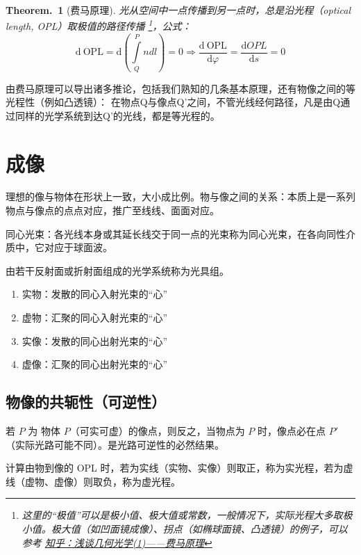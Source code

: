 \documentclass[UTF8]{report}
\theoremstyle{MyLineTheoremStyle} %
\theoremstyle{MyBlockTheoremStyle} %
\newtheorem{BlockTheorem}[LineTheorem]{Theorem.\,} %
\theoremstyle{MySubsubsectionStyle} %
\begin{document}
\begin{BlockTheorem}[费马原理]\label{费马原理}
光从空间中一点传播到另一点时，总是沿光程（optical length, OPL）取极值的路径传播 \footnote{这里的“极值”可以是极小值、极大值或常数，一般情况下，实际光程大多取极小值。极大值（如凹面镜成像）、拐点（如椭球面镜、凸透镜）的例子，可以参考 \href{https://zhuanlan.zhihu.com/p/107739173}{知乎：浅谈几何光学(1)——费马原理}}，公式：
\begin{equation}
    \mathrm{d}\ \mathrm{OPL} =  \mathrm{d}\left(\int\limits_{Q}^{P}ndl\right)=0 \Longrightarrow \frac{\mathrm{d}\  \mathrm{OPL} }{\mathrm{d} \varphi } = \frac{\mathrm{d} OPL }{\mathrm{d} s } = 0 
\end{equation}
\end{BlockTheorem}
由费马原理可以导出诸多推论，包括我们熟知的几条基本原理，还有物像之间的等光程性（例如凸透镜）：
在物点Q与像点Q’之间，不管光线经何路径，凡是由Q通过同样的光学系统到达Q’的光线，都是等光程的。

\section{成像}

理想的像与物体在形状上一致，大小成比例。物与像之间的关系：本质上是一系列物点与像点的点点对应，推广至线线、面面对应。

同心光束：各光线本身或其延长线交于同一点的光束称为同心光束，在各向同性介质中，它对应于球面波。

由若干反射面或折射面组成的光学系统称为光具组。

\begin{enumerate}
\item 实物：发散的同心入射光束的“心”
\item 虚物：汇聚的同心入射光束的“心”
\item 实像：发散的同心出射光束的“心”
\item 虚像：汇聚的同心出射光束的“心”
\end{enumerate}

\subsection{物像的共轭性（可逆性）}

若 $P$ 为 物体 $P$（可实可虚）的像点，则反之，当物点为 $P$ 时，像点必在点 $P'$（实际光路可能不同）。是光路可逆性的必然结果。 

计算由物到像的 OPL 时，若为实线（实物、实像）则取正，称为实光程，若为虚线（虚物、虚像）则取负，称为虚光程。
\end{document}
